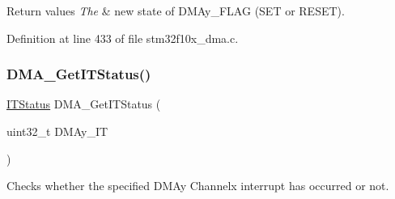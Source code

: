 \begin{DoxyRetVals}{Return values}
{\em The} & new state of D\+M\+Ay\+\_\+\+F\+L\+AG (S\+ET or R\+E\+S\+ET). \\
\hline
\end{DoxyRetVals}


Definition at line 433 of file stm32f10x\+\_\+dma.\+c.

\mbox{\label{group___d_m_a___private___functions_ga9287331247150fe84d03ecd7ad8adb52}} 
\subsubsection{\texorpdfstring{D\+M\+A\+\_\+\+Get\+I\+T\+Status()}{DMA\_GetITStatus()}}
{\footnotesize\ttfamily \hyperlink{group___exported__types_gaacbd7ed539db0aacd973a0f6eca34074}{I\+T\+Status} D\+M\+A\+\_\+\+Get\+I\+T\+Status (\begin{DoxyParamCaption}\item[{uint32\+\_\+t}]{D\+M\+Ay\+\_\+\+IT }\end{DoxyParamCaption})}



Checks whether the specified D\+M\+Ay Channelx interrupt has occurred or not. 



